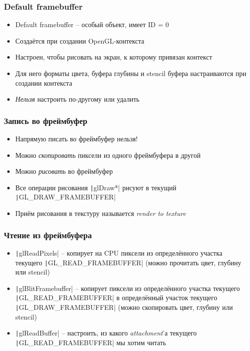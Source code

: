\documentclass[10pt]{beamer}
\begin{document}
\begin{frame}[fragile]
\frametitle{Default framebuffer}
\begin{itemize}
\item Default framebuffer -- особый объект, имеет ID = 0
\pause
\item Создаётся при создании OpenGL-контекста
\pause
\item Настроен, чтобы рисовать на экран, к которому привязан контекст
\pause
\item Для него форматы цвета, буфера глубины и stencil буфера настраиваются при создании контекста
\pause
\item \textit{Нельзя} настроить по-другому или удалить
\end{itemize}
\end{frame}

\begin{frame}[fragile]
\frametitle{Запись во фреймбуфер}
\begin{itemize}
\item Напрямую писать во фреймбуфер нельзя!
\pause
\item Можно \textit{скопировать} пиксели из одного фреймбуфера в другой
\pause
\item Можно \textit{рисовать} во фреймбуфер
\pause
\item Все операции рисования \texttt|glDraw*| рисуют в текущий \texttt|GL_DRAW_FRAMEBUFFER|
\pause
\item Приём рисования в текстуру называется \textit{render to texture}
\end{itemize}
\end{frame}

\begin{frame}[fragile]
\frametitle{Чтение из фреймбуфера}
\begin{itemize}
\item \texttt|glReadPixels| -- копирует на CPU пиксели из определённого участка текущего \texttt|GL_READ_FRAMEBUFFER| (можно прочитать цвет, глубину или stencil)
\pause
\item \texttt|glBlitFramebuffer| -- копирует пиксели из определённого участка текущего \texttt|GL_READ_FRAMEBUFFER| в определённый участок текущего \texttt|GL_DRAW_FRAMEBUFFER| (можно скопировать цвет, глубину или stencil)
\pause
\item \texttt|glReadBuffer| -- настроить, из какого \textit{attachment}'а текущего \texttt|GL_READ_FRAMEBUFFER| мы хотим читать
\end{itemize}
\end{frame}
\end{document}
